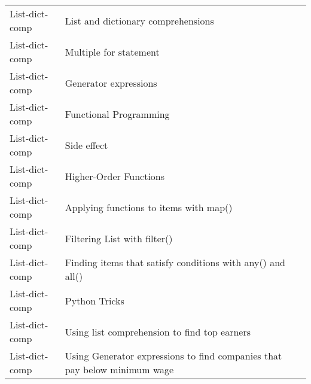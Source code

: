 \documentclass[10pt,a4paper]{article}
\begin{document}
\begin{landscape}
\begin{longtable}{|l|l|l|}
List-dict-comp & List and dictionary comprehensions & \cite{ceder2018quick} \\
    List-dict-comp & Multiple for statement & \cite{danjou2018serious} \\
    List-dict-comp & Generator expressions & \cite{ceder2018quick} \\
    List-dict-comp & Functional Programming & \cite{sweigart2020beyond} \\
    List-dict-comp & Side effect & \cite{sweigart2020beyond} \\
    List-dict-comp & Higher-Order Functions & \cite{sweigart2020beyond} \\
    List-dict-comp & Applying functions to items with map() & \cite{danjou2018serious} \\
    List-dict-comp & Filtering List with filter() & \cite{danjou2018serious} \\
    List-dict-comp & Finding items that satisfy conditions with any() and all() & \cite{danjou2018serious} \\
    List-dict-comp & Python Tricks & \cite{mayer2020oneliners} \\
    List-dict-comp & Using list comprehension to find top earners & \cite{mayer2020oneliners} \\
    List-dict-comp & Using Generator expressions to find companies that pay below minimum wage & \cite{mayer2020oneliners} \\
    

\end{longtable}
\end{landscape}

\restoregeometry


\end{document}
